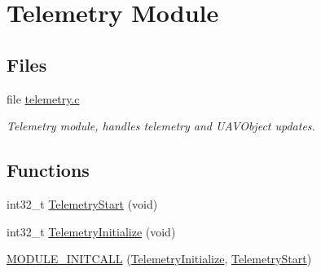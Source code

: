\hypertarget{group___telemetry_module}{\section{\-Telemetry \-Module}
\label{group___telemetry_module}
}
\subsection*{\-Files}
\begin{DoxyCompactItemize}
\item 
file \hyperlink{telemetry_8c}{telemetry.\-c}
\begin{DoxyCompactList}\small\item\em \-Telemetry module, handles telemetry and \-U\-A\-V\-Object updates. \end{DoxyCompactList}\end{DoxyCompactItemize}
\subsection*{\-Functions}
\begin{DoxyCompactItemize}
\item 
int32\-\_\-t \hyperlink{group___telemetry_module_ga251dc0181b1a02544cdee5e599bfc240}{\-Telemetry\-Start} (void)
\item 
int32\-\_\-t \hyperlink{group___telemetry_module_ga058925ecc8ea2cd938fb3e9d21edb2ac}{\-Telemetry\-Initialize} (void)
\item 
\hyperlink{group___telemetry_module_ga76c4e3aa3c280b8fe0a71d2aa8d6ffd3}{\-M\-O\-D\-U\-L\-E\-\_\-\-I\-N\-I\-T\-C\-A\-L\-L} (\hyperlink{group___telemetry_module_ga058925ecc8ea2cd938fb3e9d21edb2ac}{\-Telemetry\-Initialize}, \hyperlink{group___telemetry_module_ga251dc0181b1a02544cdee5e599bfc240}{\-Telemetry\-Start})
\end{DoxyCompactItemize}


